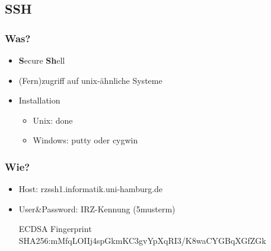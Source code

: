 \documentclass{beamer}
\begin{document}
    \subsection{SSH}
    \begin{frame}
        \frametitle{Was?}
        \begin{itemize}
            \item \textbf{S}ecure \textbf{Sh}ell
            \item (Fern)zugriff auf unix-ähnliche Systeme
            \item Installation
            \begin{itemize}
            \item Unix: done
            \item Windows: putty oder cygwin
            \end{itemize}
        \end{itemize}
    \end{frame}
    \begin{frame}
        \frametitle{Wie?}
        \begin{itemize}
            \item Host: rzssh1.informatik.uni-hamburg.de
            \item User\&Password: IRZ-Kennung (5musterm)
            \begin{block}{ECDSA Fingerprint}
                SHA256:mMfqLOIIj4spGkmKC3gvYpXqRI3/K8waCYGBqXGfZGk
            \end{block}
        \end{itemize}
    \end{frame}
\end{document}
